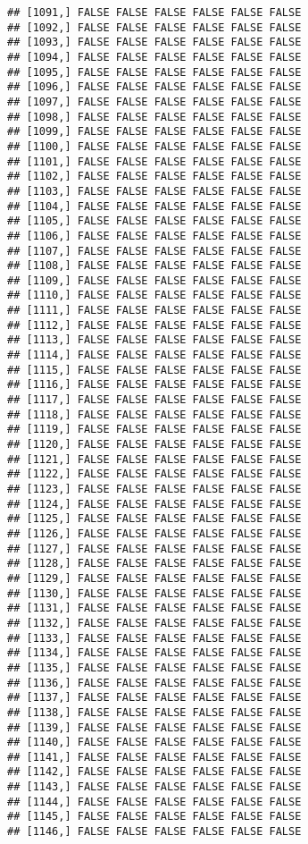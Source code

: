 \documentclass[
]{article}
\begin{document}
\begin{verbatim}
## [1091,] FALSE FALSE FALSE FALSE FALSE FALSE
## [1092,] FALSE FALSE FALSE FALSE FALSE FALSE
## [1093,] FALSE FALSE FALSE FALSE FALSE FALSE
## [1094,] FALSE FALSE FALSE FALSE FALSE FALSE
## [1095,] FALSE FALSE FALSE FALSE FALSE FALSE
## [1096,] FALSE FALSE FALSE FALSE FALSE FALSE
## [1097,] FALSE FALSE FALSE FALSE FALSE FALSE
## [1098,] FALSE FALSE FALSE FALSE FALSE FALSE
## [1099,] FALSE FALSE FALSE FALSE FALSE FALSE
## [1100,] FALSE FALSE FALSE FALSE FALSE FALSE
## [1101,] FALSE FALSE FALSE FALSE FALSE FALSE
## [1102,] FALSE FALSE FALSE FALSE FALSE FALSE
## [1103,] FALSE FALSE FALSE FALSE FALSE FALSE
## [1104,] FALSE FALSE FALSE FALSE FALSE FALSE
## [1105,] FALSE FALSE FALSE FALSE FALSE FALSE
## [1106,] FALSE FALSE FALSE FALSE FALSE FALSE
## [1107,] FALSE FALSE FALSE FALSE FALSE FALSE
## [1108,] FALSE FALSE FALSE FALSE FALSE FALSE
## [1109,] FALSE FALSE FALSE FALSE FALSE FALSE
## [1110,] FALSE FALSE FALSE FALSE FALSE FALSE
## [1111,] FALSE FALSE FALSE FALSE FALSE FALSE
## [1112,] FALSE FALSE FALSE FALSE FALSE FALSE
## [1113,] FALSE FALSE FALSE FALSE FALSE FALSE
## [1114,] FALSE FALSE FALSE FALSE FALSE FALSE
## [1115,] FALSE FALSE FALSE FALSE FALSE FALSE
## [1116,] FALSE FALSE FALSE FALSE FALSE FALSE
## [1117,] FALSE FALSE FALSE FALSE FALSE FALSE
## [1118,] FALSE FALSE FALSE FALSE FALSE FALSE
## [1119,] FALSE FALSE FALSE FALSE FALSE FALSE
## [1120,] FALSE FALSE FALSE FALSE FALSE FALSE
## [1121,] FALSE FALSE FALSE FALSE FALSE FALSE
## [1122,] FALSE FALSE FALSE FALSE FALSE FALSE
## [1123,] FALSE FALSE FALSE FALSE FALSE FALSE
## [1124,] FALSE FALSE FALSE FALSE FALSE FALSE
## [1125,] FALSE FALSE FALSE FALSE FALSE FALSE
## [1126,] FALSE FALSE FALSE FALSE FALSE FALSE
## [1127,] FALSE FALSE FALSE FALSE FALSE FALSE
## [1128,] FALSE FALSE FALSE FALSE FALSE FALSE
## [1129,] FALSE FALSE FALSE FALSE FALSE FALSE
## [1130,] FALSE FALSE FALSE FALSE FALSE FALSE
## [1131,] FALSE FALSE FALSE FALSE FALSE FALSE
## [1132,] FALSE FALSE FALSE FALSE FALSE FALSE
## [1133,] FALSE FALSE FALSE FALSE FALSE FALSE
## [1134,] FALSE FALSE FALSE FALSE FALSE FALSE
## [1135,] FALSE FALSE FALSE FALSE FALSE FALSE
## [1136,] FALSE FALSE FALSE FALSE FALSE FALSE
## [1137,] FALSE FALSE FALSE FALSE FALSE FALSE
## [1138,] FALSE FALSE FALSE FALSE FALSE FALSE
## [1139,] FALSE FALSE FALSE FALSE FALSE FALSE
## [1140,] FALSE FALSE FALSE FALSE FALSE FALSE
## [1141,] FALSE FALSE FALSE FALSE FALSE FALSE
## [1142,] FALSE FALSE FALSE FALSE FALSE FALSE
## [1143,] FALSE FALSE FALSE FALSE FALSE FALSE
## [1144,] FALSE FALSE FALSE FALSE FALSE FALSE
## [1145,] FALSE FALSE FALSE FALSE FALSE FALSE
## [1146,] FALSE FALSE FALSE FALSE FALSE FALSE

\end{verbatim}
\end{document}
